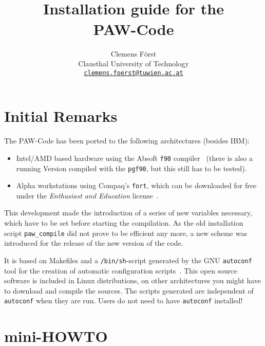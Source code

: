 \documentclass[a4paper,10pt]{article}
\title{\hrulefill \\ {\Large \bf Installation guide for the \\} 
                  {\Huge \bf PAW-Code} \\ \vspace*{-0.3cm} \hrulefill}
\author{\small  Clemens F\"orst \\ 
        \small Clausthal University of Technology \\ 
        \small \underline{\texttt{clemens.foerst@tuwien.ac.at}}}
\date{}
\begin{document}
\maketitle
\tableofcontents

\section{Initial Remarks}

The \textsc{PAW}-Code has been ported to the following architectures (besides IBM):
\begin{itemize}
\item Intel/AMD based hardware using the Absoft \texttt{f90}
  compiler~\cite{f90} (there is also a running Version compiled with the
\texttt{pgf90}, but this still has to be tested).  
\item Alpha workstations using Compaq's \texttt{fort},
  which can be downloaded for free under the \textit{Enthusiast and Education}
  license~\cite{fort}.
\end{itemize}
This development made the introduction of a series of new variables necessary,
which have to be set before starting the compilation.  As the old installation
script \texttt{paw\_compile} did not prove to be efficient any more, a new
scheme was introduced for the release of the new version of the code.

It is based on Makefiles and a \texttt{/bin/sh}-script generated by the GNU
\texttt{autoconf} tool for the creation of automatic configuration
scripts~\cite{autoconf,autoconf2}.  This open source software is included in
Linux distributions, on other architectures you might have to download and
compile the sources.  The scripts generated are independent of
\texttt{autoconf} when they are run. Users do not need to have
\texttt{autoconf} installed!


\section{mini-HOWTO}
\end{document}
